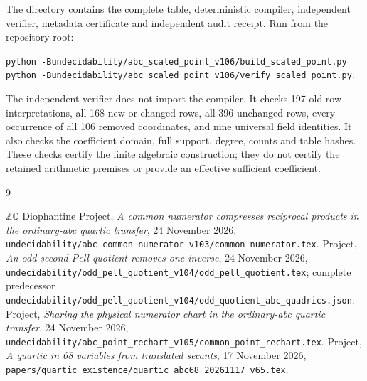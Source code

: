 \documentclass[11pt]{article}
\newcommand{\Q}{\mathbb Q}\newcommand{\Z}{\mathbb Z}
\begin{document}
The directory contains the complete table, deterministic compiler,
independent verifier, metadata certificate and independent audit receipt.
Run from the repository root:
\begin{center}\small
\texttt{python -B}\enspace\nolinkurl{undecidability/abc_scaled_point_v106/build_scaled_point.py}\\
\texttt{python -B}\enspace\nolinkurl{undecidability/abc_scaled_point_v106/verify_scaled_point.py}.
\end{center}
The independent verifier does not import the compiler. It checks 197
old row interpretations, all 168 new or changed rows, all 396 unchanged
rows, every occurrence of all 106 removed coordinates, and nine
universal field identities. It also checks the coefficient domain,
full support, degree, counts and table hashes. These checks certify the
finite algebraic construction; they do not certify the retained
arithmetic premises or provide an effective sufficient coefficient.

\small
\begin{thebibliography}{9}\raggedright
\setlength{\itemsep}{2pt}
 \(\Z\Q\) Diophantine Project,
\emph{A common numerator compresses reciprocal products in the ordinary-abc
quartic transfer}, 24 November 2026,
\nolinkurl{undecidability/abc_common_numerator_v103/common_numerator.tex}.
 Project, \emph{An odd second-Pell quotient removes one inverse},
24 November 2026,
\nolinkurl{undecidability/odd_pell_quotient_v104/odd_pell_quotient.tex};
complete predecessor
\nolinkurl{undecidability/odd_pell_quotient_v104/odd_quotient_abc_quadrics.json}.
 Project, \emph{Sharing the physical numerator chart in
the ordinary-abc quartic transfer}, 24 November 2026,
\nolinkurl{undecidability/abc_point_rechart_v105/common_point_rechart.tex}.
 Project, \emph{A quartic in 68 variables from translated
secants}, 17 November 2026,
\nolinkurl{papers/quartic_existence/quartic_abc68_20261117_v65.tex}.
\end{thebibliography}
\end{document}
